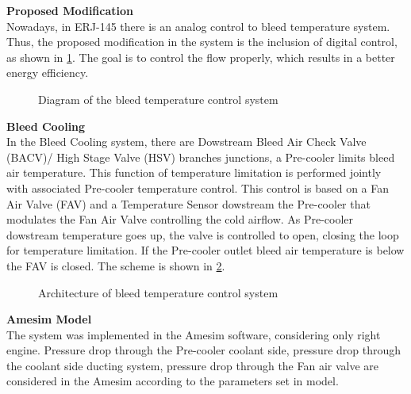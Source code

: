 \textbf{Proposed Modification}\\
Nowadays, in ERJ-145 there is an analog control to bleed temperature system. Thus, the proposed modification  in the system is the inclusion of digital control, as shown in  \ref{fig:BD}.
The goal is to control the flow properly, which results in a better energy efficiency.

\begin{figure}[H] %
\caption{Diagram of the bleed temperature control system}
\label{fig:BD}
\end{figure}

\textbf{Bleed Cooling}\\
In the Bleed Cooling system, there are Dowstream Bleed Air Check Valve (BACV)/ High Stage Valve (HSV) branches junctions, a Pre-cooler limits bleed air temperature. This function of temperature limitation is performed jointly with associated Pre-cooler temperature control. This control is based on a Fan Air Valve (FAV) and a Temperature Sensor dowstream the Pre-cooler that modulates the Fan Air Valve controlling the cold airflow. As Pre-cooler dowstream temperature goes up, the valve is controlled to open, closing the loop for temperature limitation. If the Pre-cooler outlet bleed air temperature is below the FAV is closed. The scheme is shown in \ref{fig:arch}.

\begin{figure}[H] %
\caption{Architecture of bleed temperature control system}
\label{fig:arch}
\end{figure}

\textbf{Amesim Model}\\
The system was implemented in the Amesim software, considering only right engine.
Pressure drop through the Pre-cooler coolant side, pressure drop through the coolant side ducting system, pressure drop through the Fan air valve are considered in the Amesim according to the parameters set in model.


